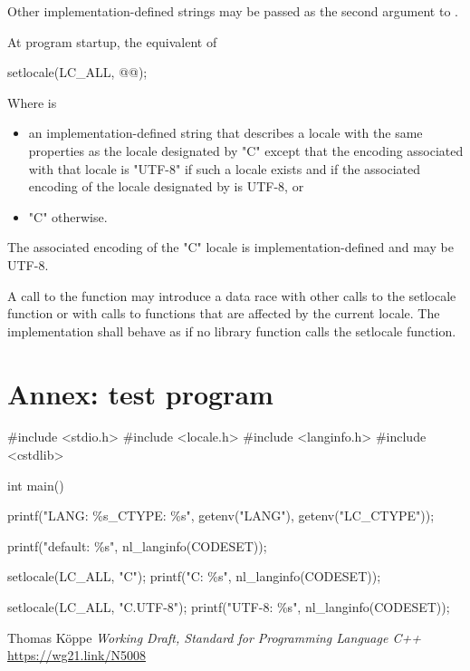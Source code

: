 \documentclass{wg21}
\begin{document}
Other implementation-defined strings may be passed as the second argument to .

At program startup, the equivalent of
\begin{colorblock}
    setlocale(LC_ALL, @@);
\end{colorblock}

\begin{addedblock}
Where  is
\begin{itemize}
\item an implementation-defined string that describes a locale with the same properties as the locale designated by "C" except that the encoding associated with that locale is "UTF-8" if such a locale exists and if the associated encoding of the locale designated by  is UTF-8, or
\item "C" otherwise.
\end{itemize}

\begin{note}
The associated encoding of the "C" locale is implementation-defined and may be UTF-8.
\end{note}

\end{addedblock}

A call to the  function may introduce a data race with other calls to the setlocale
function or with calls to functions that are affected by the current locale. The implementation shall
behave as if no library function calls the setlocale function.


\section{Annex: test program}

\begin{colorblock}

#include <stdio.h>
#include <locale.h>
#include <langinfo.h>
#include <cstdlib>

int main() {
    printf("LANG: \%s\nLC_CTYPE: \%s\n",
    getenv("LANG"),
    getenv("LC_CTYPE"));

    printf("default: \%s\n", nl_langinfo(CODESET));

    setlocale(LC_ALL, "C");
    printf("C: \%s\n", nl_langinfo(CODESET));

    setlocale(LC_ALL, "C.UTF-8");
    printf("UTF-8: \%s\n", nl_langinfo(CODESET));
}
\end{colorblock}





\renewcommand{\section}[2]{}%

\begin{thebibliography}{9}



Thomas Köppe
\emph{Working Draft, Standard for Programming Language C++}\newline
\url{https://wg21.link/N5008}


\end{thebibliography}
\end{document}

